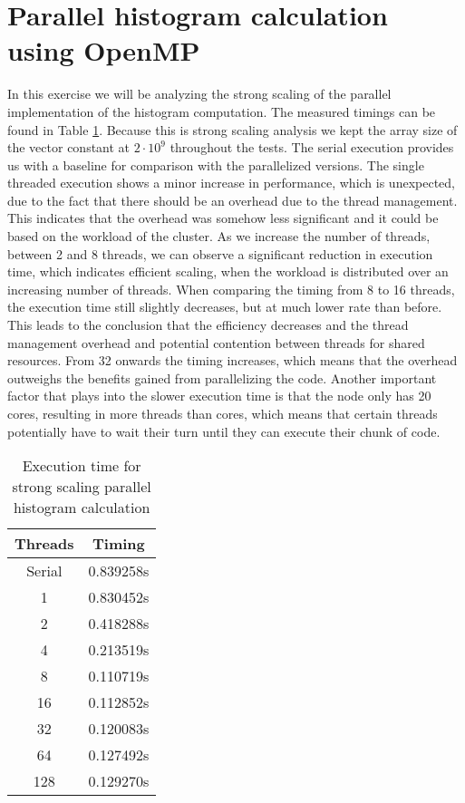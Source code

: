 \section{Parallel histogram calculation using OpenMP}
In this exercise we will be analyzing the strong scaling of the parallel implementation of the histogram computation. The measured timings can be found in Table \ref{tab:hist-scaling}.
Because this is strong scaling analysis we kept the array size of the vector constant at $2 \cdot 10^9$ throughout the tests.\newline
The serial execution provides us with a baseline for comparison with the parallelized versions.
The single threaded execution shows a minor increase in performance, which is unexpected, due to the fact that there should be an overhead due to the thread management. This  indicates that the overhead was somehow less significant and it could be based on the workload of the cluster.
As we increase the number of threads, between 2 and 8 threads, we can observe a significant reduction in execution time, which indicates efficient scaling, when the workload is distributed over an increasing number of threads.\newline
When comparing the timing from 8 to 16 threads, the execution time still slightly decreases, but at much lower rate than before. This leads to the conclusion that the efficiency decreases and the thread management overhead and potential contention between threads for shared resources.\newline
From 32 onwards the timing increases, which means that the overhead outweighs the benefits gained from parallelizing the code. Another important factor that plays into the slower execution time is that the node only has 20 cores, resulting in more threads than cores, which means that certain threads potentially have to wait their turn until they can execute their chunk of code.
\begin{table}[H]
	\centering
	\begin{tabular}{|c|c|}
		\hline
		\textbf{Threads} & \textbf{Timing} \\ \hline
		Serial           & 0.839258s       \\ \hline
		1                & 0.830452s       \\ \hline
		2                & 0.418288s       \\ \hline
		4                & 0.213519s       \\ \hline
		8                & 0.110719s       \\ \hline
		16               & 0.112852s       \\ \hline
		32               & 0.120083s       \\ \hline
		64               & 0.127492s       \\ \hline
		128              & 0.129270s        \\ \hline
	\end{tabular}
	\caption{Execution time for strong scaling parallel histogram calculation}
	\label{tab:hist-scaling}
\end{table}

